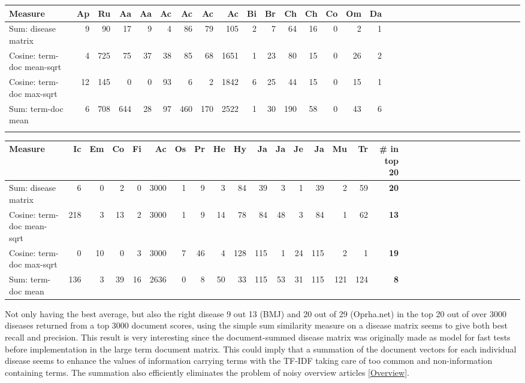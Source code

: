 \begin{table}[H]
\begin{tiny}
  \begin{tabular}{|l|r|r|r|r|r|r|r|r|r|r|r|r|r|r|r|r|r|r|r|r|r|r|r|r|r|r|r|r|r|r|r|}
    \hline
    Measure &Ap&Ru&Aa&Aa&Ac&Ac&Ac&Ac&Bi&Br&Ch&Ch&Co&Om&Da\\
    \hline
    Sum: disease matrix &9&90&17&9&4&86&79&105&2&7&64&16&0&2&1\\
    \hline
    Cosine: term-doc mean-sqrt &4&725&75&37&38&85&68&1651&1&23&80&15&0&26&2\\
    \hline
    Cosine: term-doc max-sqrt &12&145&0&0&93&6&2&1842&6&25&44&15&0&15&1\\
    \hline
    Sum: term-doc mean &6&708&644&28&97&460&170&2522&1&30&190&58&0&43&6 \\
    \hline
    \multicolumn{16}{c}{} \\
    \end{tabular}
    \begin{tabular}{|l|r|r|r|r|r|r|r|r|r|r|r|r|r|r|r|r|r|r|r|r|r|r|r|r|r|r|r|r|r|r|}
    \hline
     Measure &Ic&Em&Co&Fi&Ac&Os&Pr&He&Hy&Ja&Ja&Je&Ja&Mu&Tr &\scriptsize{\textbf{\# in top 20}} \\
    \hline
    Sum: disease matrix &6&0&2&0&3000&1&9&3&84&39&3&1&39&2&59 & \scriptsize{\textbf{20}} \\
    \hline
    Cosine: term-doc mean-sqrt &218&3&13&2&3000&1&9&14&78&84&48&3&84&1&62 & \scriptsize{\textbf{13}} \\
    \hline
    Cosine: term-doc max-sqrt &0&10&0&3&3000&7&46&4&128&115&1&24&115&2&1 & \scriptsize{\textbf{19}} \\
    \hline
    Sum: term-doc mean &136&3&39&16&2636&0&8&50&33&115&53&31&115&121&124 & \scriptsize{\textbf{8}} \\
    \hline
  \end{tabular}
\end{tiny}
\end{table}

Not only having the best average, but also the right disease 9 out 13 (BMJ) and 20 out of 29 (Oprha.net) 
in the top 20 out of over 3000 diseases returned from a top 3000 document scores, using the simple sum 
similarity measure on a disease matrix seems to give both best recall and precision. This result is very 
interesting since the document-summed disease matrix was originally made as model for fast tests before 
implementation in the large term document matrix. This could imply that a summation of the document vectors 
for each individual disease seems to enhance the values of information carrying terms with the TF-IDF taking 
care of too common and non-information containing terms. The summation also efficiently eliminates the problem 
of noisy overview articles \ref{Overview}.

